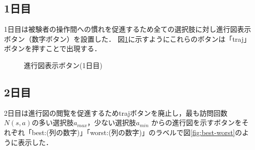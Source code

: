 \subsection{1日目}
1日目は被験者の操作間への慣れを促進するため全ての選択肢に対し進行図表示ボタン（数字ボタン）を設置した．
図\ref{fig:traj-button}に示すようにこれらのボタンは「traj」ボタンを押すことで出現する．

\begin{figure}[htbp]
    \centering
    \setlength{\fboxsep}{1pt} %
    \setlength{\fboxrule}{1pt} %
    \caption{進行図表示ボタン(1日目)}
	\label{fig:traj-button}
\end{figure}

\subsection{2日目}
2日目は進行図の閲覧を促進するためtrajボタンを廃止し，最も訪問回数$N(s,a)$の多い選択肢$a_{max}$，少ない選択肢$a_{min}$
からの進行図を示すボタンをそれぞれ「best:(列の数字)」「worst:(列の数字)」のラベルで図\ref{fig:best-worst}のように表示した．


